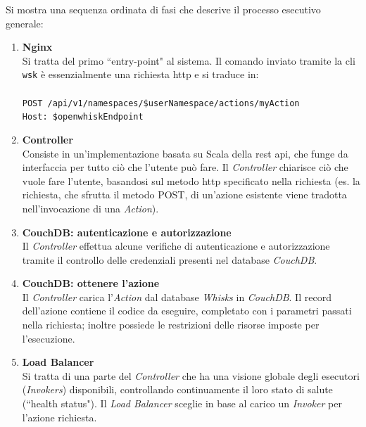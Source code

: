 \documentclass[12pt,a4paper,openany,twoside]{book}
\begin{document}
Si mostra una sequenza ordinata di fasi che descrive il processo esecutivo generale:
\begin{enumerate}
    \item \textbf{Nginx} \\
    Si tratta del primo ``entry-point" al sistema.
    Il comando inviato tramite la \ac{cli} \texttt{wsk} è essenzialmente una richiesta \ac{http} e si traduce in:
    \\ \\
    \texttt{POST /api/v1/namespaces/\$userNamespace/actions/myAction \\Host: \$openwhiskEndpoint}
    
    \item \textbf{Controller} \\
    Consiste in un'implementazione basata su Scala della \ac{rest} \ac{api}, che funge da interfaccia per tutto ciò che l'utente può fare. Il \textit{Controller} chiarisce ciò che vuole fare l'utente, basandosi sul metodo \ac{http} specificato nella richiesta (es. la richiesta, che sfrutta il metodo POST, di un'azione esistente viene tradotta nell'invocazione di una \textit{Action}).
    
    \item \textbf{CouchDB: autenticazione e autorizzazione} \\
    Il \textit{Controller} effettua alcune verifiche di autenticazione e autorizzazione tramite il controllo delle credenziali presenti nel database \textit{CouchDB}.
    
    \item \textbf{CouchDB: ottenere l'azione} \\
    Il \textit{Controller} carica l'\textit{Action} dal database \textit{Whisks} in \textit{CouchDB}. Il record dell'azione contiene il codice da eseguire, completato con i parametri passati nella richiesta; inoltre possiede le restrizioni delle risorse imposte per l'esecuzione.
    
    \item \textbf{Load Balancer} \\
    Si tratta di una parte del \textit{Controller} che ha una visione globale degli esecutori (\textit{Invokers}) disponibili, controllando continuamente il loro stato di salute (``health status"). Il \textit{Load Balancer} sceglie in base al carico un \textit{Invoker} per l'azione richiesta.
    

\end{enumerate}
\end{document}
